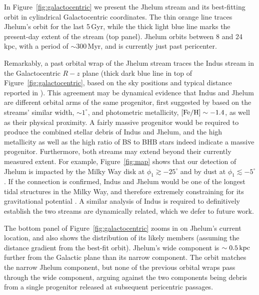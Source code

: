 \documentclass[twocolumn]{aastex62}
\newcommand{\apw}[1]{{\color{blue} APW: #1}}
\begin{document}
In Figure~\ref{fig:galactocentric} we present the Jhelum stream and its best-fitting orbit in cylindrical Galactocentric coordinates.
The thin orange line traces Jhelum's orbit for the last 5\,Gyr, while the thick light blue line marks the present-day extent of the stream (top panel).
Jhelum orbits between 8 and 24\,kpc, with a period of $\sim300$\,Myr, and is currently just past pericenter.

Remarkably, a past orbital wrap of the Jhelum stream traces the Indus stream in the Galactocentric $R-z$ plane (thick dark blue line in top of Figure~\ref{fig:galactocentric}, based on the sky positions and typical distance reported in \citealt{shipp2018}).
This agreement may be dynamical evidence that Indus and Jhelum are different orbital arms of the same progenitor, first suggested by \citet{shipp2018} based on the streams' similar width, $\sim1^\circ$, and photometric metallicity, $\rm[Fe/H]\sim-1.4$, as well as their physical proximity.
A fairly massive progenitor would be required to produce the combined stellar debris of Indus and Jhelum, and the high metallicity as well as the high ratio of BS to BHB stars indeed indicate a massive progenitor.
Furthermore, both streams may extend beyond their currently measured extent.
For example, Figure~\ref{fig:map} shows that our detection of Jhelum is impacted by the Milky Way disk at $\phi_1\gtrsim-25^\circ$ and by dust at $\phi_1\lesssim-5^\circ$.
If the connection is confirmed, Indus and Jhelum would be one of the longest tidal structures in the Milky Way, and therefore extremely constraining for its gravitational potential \citep{bh2018}.
A similar analysis of Indus is required to definitively establish the two streams are dynamically related, which we defer to future work.

The bottom panel of Figure~\ref{fig:galactocentric} zooms in on Jhelum's current location, and also shows the distribution of its likely members (assuming the distance gradient from the best-fit orbit).
Jhelum's wide component is $\sim0.5\,\rm kpc$ further from the Galactic plane than its narrow component.
The orbit matches the narrow Jhelum component, but none of the previous orbital wraps pass through the wide component, arguing against the two components being debris from a single progenitor released at subsequent pericentric passages.
\end{document}
